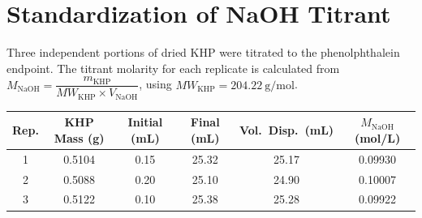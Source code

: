 \section{Standardization of NaOH Titrant}
\label{sec:standardization}
\sectionrule

Three independent portions of dried KHP were titrated to the phenolphthalein endpoint. The
titrant molarity for each replicate is calculated from
$M_{\text{NaOH}} = \dfrac{m_{\text{KHP}}}{\mathit{MW}_{\text{KHP}} \times V_{\text{NaOH}}}$,
using $\mathit{MW}_{\text{KHP}} = \SI{204.22}{\gram\per\mole}$.

\begin{center}
\begin{tabular}{c S[table-format=1.4] S[table-format=1.2] S[table-format=2.2] S[table-format=1.2] S[table-format=1.5]}
\toprule
{}
{\color{white}\bfseries Rep.} & {\color{white}\bfseries KHP Mass (g)} & {\color{white}\bfseries Initial (mL)} & {\color{white}\bfseries Final (mL)} & {\color{white}\bfseries Vol.\ Disp.\ (mL)} & {\color{white}\bfseries $M_{\text{NaOH}}$ (mol/L)} \\
 & 0.5104 & 0.15 & 25.32 & 25.17 & 0.09930 \\
2 & 0.5088 & 0.20 & 25.10 & 24.90 & 0.10007 \\
3 & 0.5122 & 0.10 & 25.38 & 25.28 & 0.09922 \\
\bottomrule
\end{tabular}
\end{center}

\vspace{6pt}

